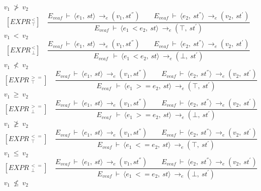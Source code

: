 \begin{math}		
v_1 \ \not> \ v_2		
\end{math} 
\[	
[EXPR^{\ <}_{\ \top}] \quad	
\dfrac{E_{veaf} \ \vdash \ \langle e_1, \ st \rangle \ \rightarrow_e (v_1, st^{''}) \qquad E_{veaf} \ \vdash \ \langle e_2, \ st^{''} \rangle \ \rightarrow_e (v_2, \ st^{'})}{E_{veaf} \ \vdash \ \langle e_1 \ < e_2, \ st \rangle \ \rightarrow_e (\top, \ st^{'})}
\]
\begin{math}		
v_1 \ < \ v_2		
\end{math} 
\[	
[EXPR^{\ <}_{\ \bot}] \quad	
\dfrac{E_{veaf} \ \vdash \ \langle e_1, \ st \rangle \ \rightarrow_e (v_1, st^{''}) \qquad E_{veaf} \ \vdash \ \langle e_2, \ st^{''} \rangle \ \rightarrow_e (v_2, \ st^{'})}{E_{veaf} \ \ \vdash \ \langle e_1 \ < e_2, \ st \rangle \ \rightarrow_e (\bot, \ st^{'})}	
\]
\begin{math}		
v_1 \ \not< \ v_2		
\end{math}
\[	
[EXPR^{\ >=}_{\ \ \top}] \quad	
\dfrac{E_{veaf} \ \vdash \ \langle e_1, \ st \rangle \ \rightarrow_e (v_1, st^{''}) \qquad E_{veaf} \ \vdash \ \langle e_2, \ st^{''} \rangle \ \rightarrow_e (v_2, \ st^{'})}{E_{veaf} \ \ \vdash \ \langle e_1 \ >= e_2, \ st \rangle \ \rightarrow_e (\top, \ st^{'})}	
\]
\begin{math}		
v_1 \ \ge \ v_2		
\end{math} 
\[	
[EXPR^{\ >=}_{\ \ \bot}] \quad	
\dfrac{E_{veaf} \ \vdash \ \langle e_1, \ st \rangle \ \rightarrow_e (v_1, st^{''}) \qquad E_{veaf} \ \vdash \ \langle e_2, \ st^{''} \rangle \ \rightarrow_e (v_2, \ st^{'})}{E_{veaf} \ \ \vdash \ \langle e_1 \ >= e_2, \ st \rangle \ \rightarrow_e (\bot, \ st^{'})}	
\]
\begin{math}		
v_1 \ \ngeq \ v_2		
\end{math}
\[
[EXPR^{\ <=}_{\ \ \top}] \quad
\dfrac{E_{veaf} \ \vdash \ \langle e_1, \ st \rangle \ \rightarrow_e (v_1, st^{''}) \qquad E_{veaf} \ \vdash \ \langle e_2, \ st^{''} \rangle \ \rightarrow_e (v_2, \ st^{'})}{E_{veaf} \ \vdash \ \langle e_1 \ <= e_2, \ st \rangle \ \rightarrow_e (\top, \ st^{'})}
\]
\begin{math}		
v_1 \ \le \ v_2		
\end{math} 
\[	
[EXPR^{\ <=}_{\ \ \bot}] \quad	
\dfrac{E_{veaf} \ \vdash \ \langle e_1, \ st \rangle \ \rightarrow_e (v_1, st^{''}) \qquad E_{veaf} \ \vdash \ \langle e_2, \ st^{''} \rangle \ \rightarrow_e (v_2, \ st^{'})}{E_{veaf} \ \vdash \ \langle e_1 \ <= e_2, \ st \rangle \ \rightarrow_e (\bot, \ st^{'})}	
\]
\begin{math}		
v_1 \ \nleq \ v_2		
\end{math}
